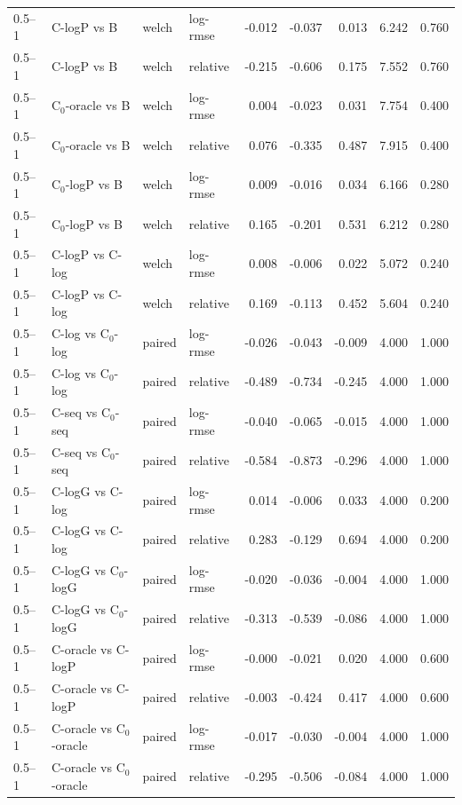 \begin{longtable}{llllrrrrr}
0.5–1 & C-logP vs B & welch & log-rmse & -0.012 & -0.037 & 0.013 & 6.242 & 0.760 \\
0.5–1 & C-logP vs B & welch & relative & -0.215 & -0.606 & 0.175 & 7.552 & 0.760 \\
0.5–1 & C$_0$-oracle vs B & welch & log-rmse & 0.004 & -0.023 & 0.031 & 7.754 & 0.400 \\
0.5–1 & C$_0$-oracle vs B & welch & relative & 0.076 & -0.335 & 0.487 & 7.915 & 0.400 \\
0.5–1 & C$_0$-logP vs B & welch & log-rmse & 0.009 & -0.016 & 0.034 & 6.166 & 0.280 \\
0.5–1 & C$_0$-logP vs B & welch & relative & 0.165 & -0.201 & 0.531 & 6.212 & 0.280 \\
0.5–1 & C-logP vs C-log & welch & log-rmse & 0.008 & -0.006 & 0.022 & 5.072 & 0.240 \\
0.5–1 & C-logP vs C-log & welch & relative & 0.169 & -0.113 & 0.452 & 5.604 & 0.240 \\
0.5–1 & C-log vs C$_0$-log & paired & log-rmse & -0.026 & -0.043 & -0.009 & 4.000 & 1.000 \\
0.5–1 & C-log vs C$_0$-log & paired & relative & -0.489 & -0.734 & -0.245 & 4.000 & 1.000 \\
0.5–1 & C-seq vs C$_0$-seq & paired & log-rmse & -0.040 & -0.065 & -0.015 & 4.000 & 1.000 \\
0.5–1 & C-seq vs C$_0$-seq & paired & relative & -0.584 & -0.873 & -0.296 & 4.000 & 1.000 \\
0.5–1 & C-logG vs C-log & paired & log-rmse & 0.014 & -0.006 & 0.033 & 4.000 & 0.200 \\
0.5–1 & C-logG vs C-log & paired & relative & 0.283 & -0.129 & 0.694 & 4.000 & 0.200 \\
0.5–1 & C-logG vs C$_0$-logG & paired & log-rmse & -0.020 & -0.036 & -0.004 & 4.000 & 1.000 \\
0.5–1 & C-logG vs C$_0$-logG & paired & relative & -0.313 & -0.539 & -0.086 & 4.000 & 1.000 \\
0.5–1 & C-oracle vs C-logP & paired & log-rmse & -0.000 & -0.021 & 0.020 & 4.000 & 0.600 \\
0.5–1 & C-oracle vs C-logP & paired & relative & -0.003 & -0.424 & 0.417 & 4.000 & 0.600 \\
0.5–1 & C-oracle vs C$_0$-oracle & paired & log-rmse & -0.017 & -0.030 & -0.004 & 4.000 & 1.000 \\
0.5–1 & C-oracle vs C$_0$-oracle & paired & relative & -0.295 & -0.506 & -0.084 & 4.000 & 1.000 \\

\end{longtable}
